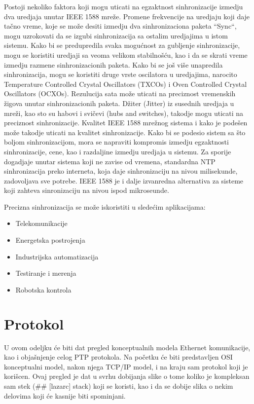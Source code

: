 \documentclass[a4paper,12pt, master]{etf}
\begin{document}
	Postoji nekoliko faktora koji mogu uticati na egzaktnost sinhronizacije izmedju dva 
	uredjaja unutar IEEE 1588 mre\v{z}e. Promene frekvencije na uredjaju koji daje ta\v{c}no vreme, 
	koje se mo\v{z}e desiti izmedju dva sinhronizaciona paketa ``Sync``, mogu uzrokovati da se 
	izgubi sinhronizacija sa ostalim uredjajima u istom sistemu. Kako bi se predupredila 
	svaka mogu\'{c}nost za gubljenje sinhronizacije, mogu se koristiti uredjaji sa veoma velikom 
	stabilno\v{s}\'{c}u, kao i da se skrati vreme izmedju razmene sinhronizacionih paketa. Kako bi 
	se jo\v{s} vi\v{s}e unapredila sinhronizacija, mogu se koristiti druge vrste oscilatora u 
	uredjajima, narocito Temperature Controlled Crystal Oscillators (TXCOs) i Oven Controlled Crystal 
	Oscillators (OCXOs). Rezulucija sata mo\v{z}e uticati na preciznost vremenskih \v{z}igova unutar 
	sinhronizacionih paketa. D\v{z}iter (Jitter) iz susednih uredjaja u mre\v{z}i, kao sto su habovi i 
	svi\v{c}evi (hubs and switches), takodje mogu uticati na preciznost sinhronizacije. Kvalitet IEEE 1588 
	mre\v{z}nog sistema i kako je pode\v{s}en mo\v{z}e takodje uticati na kvalitet sinhronizacije. Kako bi 
	se podesio sistem sa \v{s}to boljom sinhronizacijom, mora se napraviti kompromis izmedju 
	egzaktnosti sinhronizacije, cene, kao i razdaljine izmedju uredjaja u sistemu. Za sporije 
	dogadjaje unutar sistema koji ne zavise od vremena, standardna NTP sinhronizacija preko 
	interneta, koja daje sinhronizaciju na nivou milisekunde, zadovoljava sve potrebe. IEEE 
	1588 je i dalje izvanredna alternativa za sisteme koji zahteva sinronizaciju na nivou ispod 
	mikroseunde.
	
	Precizna sinhronizacija se mo\v{z}e iskoristiti u slede\'{c}im aplikacijama:
	\begin{itemize}
		\item Telekomunikacije
		\item Energetska postrojenja
		\item Industrijska automatizacija
		\item Testiranje i merenja
		\item Robotska kontrola
	\end{itemize}
	
	\newpage

    \chapter{Protokol}
    
    U ovom odeljku \'{c}e biti dat pregled konceptualnih modela Ethernet komunikacije, kao i obja\v{s}njenje 
    celog PTP protokola. Na po\v{c}etku \'{c}e biti predstavljen OSI konceptualni model, nakon njega TCP/IP 
    model, i na kraju sam protokol koji je kori\v{s}cen. Ovaj pregled je dat u svrhu dobijanja slike o tome 
    koliko je kompleksan sam stek (\#\# [lazarc] stack) koji se koristi, kao i da se dobije slika o nekim 
    delovima koji \'{c}e kasnije biti spominjani.
\end{document}
